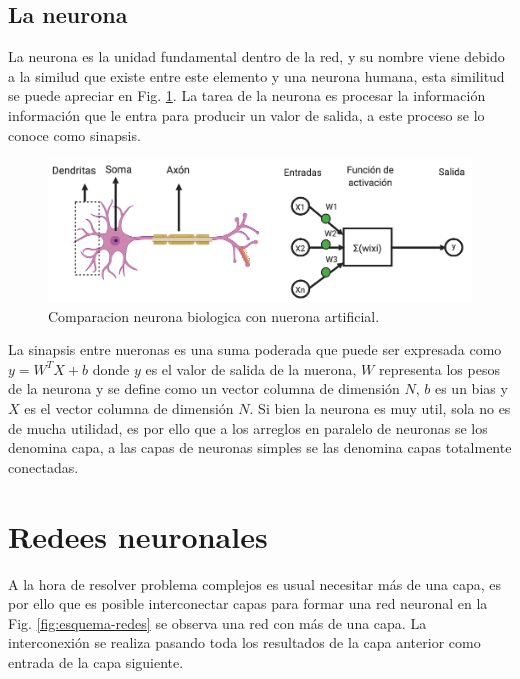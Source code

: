 \subsection{La neurona}

La neurona es la unidad fundamental dentro de la red, y su nombre viene debido a la similud que existe entre este elemento y una neurona humana, esta similitud se puede apreciar en Fig. \ref{fig:comparativa-neuronas}. La tarea de la neurona es procesar la información información que le entra para producir un valor de salida, a este proceso se lo conoce como sinapsis.

\begin{figure}[h]
    \centering
    \includegraphics[width=1\textwidth]{imgs/comparacion-neurona-red.png}
    \caption{Comparacion neurona biologica con nuerona artificial.}
    \label{fig:comparativa-neuronas}
\end{figure}

La sinapsis entre nueronas es una suma poderada que puede ser expresada como $y =W^T X + b$ donde $y$ es el valor de salida de la nuerona,
$W$ representa los pesos de la neurona y se define como un vector columna de dimensión $N$, $b$ es un bias y $X$ es el vector columna de dimensión $N$. Si bien la neurona es muy util, sola no es de mucha utilidad, es por ello que a los arreglos en paralelo de neuronas se los denomina capa, a las capas de neuronas simples se las denomina capas totalmente conectadas.

\section{Redees neuronales}

A la hora de resolver problema complejos es usual necesitar más de una capa, es por ello que es posible interconectar capas para formar una red neuronal en la Fig. \ref{fig:esquema-redes} se observa una red con más de una capa. La interconexión se realiza pasando toda los resultados de la capa anterior como entrada de la capa siguiente.

